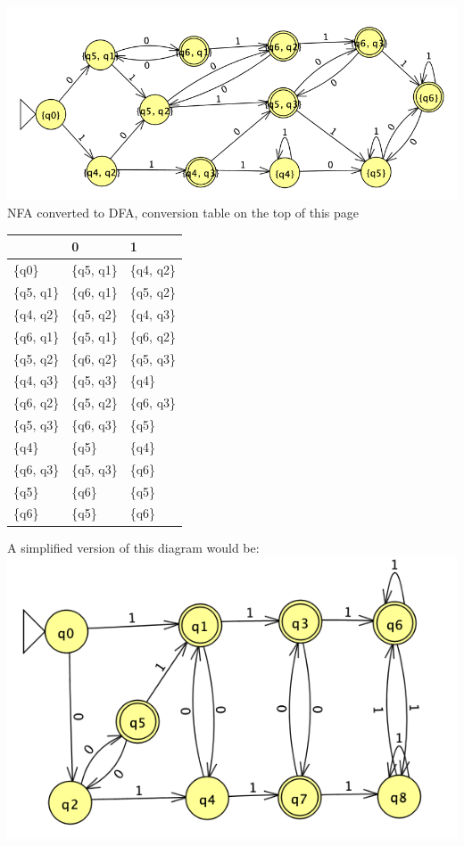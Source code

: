\documentclass{homework}
\begin{document}
\begin{center}
\includegraphics{A1Q3DFAFinal.png}\\
NFA converted to DFA, conversion table on the top of this page\\
\end{center}
\begin{center}
\begin{table}[]
\begin{tabular}{|l|l|l|}
\hline
           & 0          & 1          \\ \hline
\{q0\}     & \{q5, q1\} & \{q4, q2\} \\ \hline
\{q5, q1\} & \{q6, q1\} & \{q5, q2\} \\ \hline
\{q4, q2\} & \{q5, q2\} & \{q4, q3\} \\ \hline
\{q6, q1\} & \{q5, q1\} & \{q6, q2\} \\ \hline
\{q5, q2\} & \{q6, q2\} & \{q5, q3\} \\ \hline
\{q4, q3\} & \{q5, q3\} & \{q4\}     \\ \hline
\{q6, q2\} & \{q5, q2\} & \{q6, q3\} \\ \hline
\{q5, q3\} & \{q6, q3\} & \{q5\}     \\ \hline
\{q4\}     & \{q5\}     & \{q4\}     \\ \hline
\{q6, q3\} & \{q5, q3\} & \{q6\}     \\ \hline
\{q5\}     & \{q6\}     & \{q5\}     \\ \hline
\{q6\}     & \{q5\}     & \{q6\}     \\ \hline
\end{tabular}
\end{table}
A simplified version of this diagram would be:\\
\includegraphics{A1Q3DFAFinal1.png}\\
\end{center}
\end{document}
